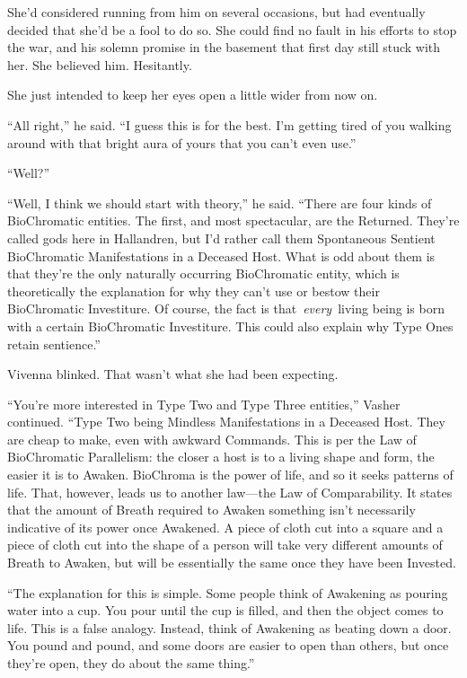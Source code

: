 She’d considered running from him on several occasions, but had eventually decided that she’d be a fool to do so. She could find no fault in his efforts to stop the war, and his solemn promise in the basement that first day still stuck with her. She believed him. Hesitantly.

She just intended to keep her eyes open a little wider from now on.

“All right,” he said. “I guess this is for the best. I’m getting tired of you walking around with that bright aura of yours that you can’t even use.”

“Well?”

“Well, I think we should start with theory,” he said. “There are four kinds of BioChromatic entities. The first, and most spectacular, are the Returned. They’re called gods here in Hallandren, but I’d rather call them Spontaneous Sentient BioChromatic Manifestations in a Deceased Host. What is odd about them is that they’re the only naturally occurring BioChromatic entity, which is theoretically the explanation for why they can’t use or bestow their BioChromatic Investiture. Of course, the fact is that~\textit{every}~living being is born with a certain BioChromatic Investiture. This could also explain why Type Ones retain sentience.”

Vivenna blinked. That wasn’t what she had been expecting.

“You’re more interested in Type Two and Type Three entities,” Vasher continued. “Type Two being Mindless Manifestations in a Deceased Host. They are cheap to make, even with awkward Commands. This is per the Law of BioChromatic Parallelism: the closer a host is to a living shape and form, the easier it is to Awaken. BioChroma is the power of life, and so it seeks patterns of life. That, however, leads us to another law—the Law of Comparability. It states that the amount of Breath required to Awaken something isn’t necessarily indicative of its power once Awakened. A piece of cloth cut into a square and a piece of cloth cut into the shape of a person will take very different amounts of Breath to Awaken, but will be essentially the same once they have been Invested.

“The explanation for this is simple. Some people think of Awakening as pouring water into a cup. You pour until the cup is filled, and then the object comes to life. This is a false analogy. Instead, think of Awakening as beating down a door. You pound and pound, and some doors are easier to open than others, but once they’re open, they do about the same thing.”

